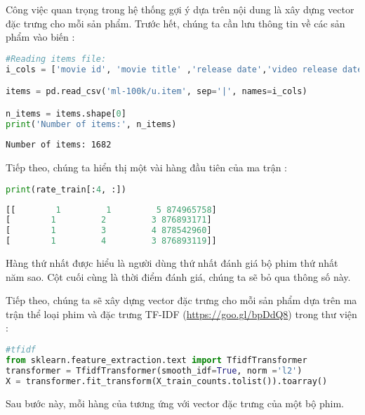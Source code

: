 Công việc quan trọng trong hệ thống gợi ý dựa trên nội dung là xây dựng
vector đặc trưng cho mỗi sản phẩm. Trước hết,
chúng ta
cần lưu thông tin về các sản phẩm vào biến :
\begin{lstlisting}[language=Python]
#Reading items file:
i_cols = ['movie id', 'movie title' ,'release date','video release date', 'IMDb URL', 'unknown', 'Action', 'Adventure', 'Animation', 'Children\'s', 'Comedy', 'Crime', 'Documentary', 'Drama', 'Fantasy', 'Film-Noir', 'Horror', 'Musical', 'Mystery', 'Romance', 'Sci-Fi', 'Thriller', 'War', 'Western']

items = pd.read_csv('ml-100k/u.item', sep='|', names=i_cols)

n_items = items.shape[0]
print('Number of items:', n_items)
\end{lstlisting}
\kq
\begin{lstlisting}
Number of items: 1682
\end{lstlisting}
Tiếp theo, chúng ta hiển thị một vài hàng đầu tiên của ma trận
:
\begin{lstlisting}[language=Python]
print(rate_train[:4, :])
\end{lstlisting}
\kq
\begin{lstlisting}[language=Python]
[[        1         1         5 874965758]
[        1         2         3 876893171]
[        1         3         4 878542960]
[        1         4         3 876893119]]
\end{lstlisting}
Hàng thứ nhất được hiểu là người dùng thứ nhất đánh giá bộ phim thứ
nhất năm sao. Cột cuối cùng là thời điểm đánh giá, chúng ta sẽ bỏ qua
thông số này.

Tiếp theo, chúng ta sẽ xây dựng vector đặc trưng cho mỗi sản phẩm dựa trên ma trận thể loại phim và đặc trưng {TF-IDF} (\url{https://goo.gl/bpDdQ8}) trong thư viện :
\begin{lstlisting}[language=Python]
#tfidf
from sklearn.feature_extraction.text import TfidfTransformer
transformer = TfidfTransformer(smooth_idf=True, norm ='l2')
X = transformer.fit_transform(X_train_counts.tolist()).toarray()
\end{lstlisting}

Sau bước này, mỗi hàng của  tương ứng với vector đặc trưng của
một bộ phim.

